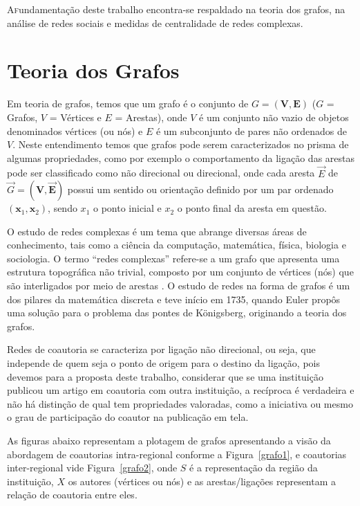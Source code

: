 

\lettrine{A} fundamentação deste trabalho encontra-se respaldado na teoria dos grafos, na análise de redes sociais e medidas de centralidade de redes complexas. 

\section{\textbf{Teoria dos Grafos}}\label{sec:grafos} 

Em teoria de grafos, temos que um grafo é o conjunto de $G = (\bm V,\bm E)$ ($G$ = Grafos, $V$ = Vértices e $E$ = Arestas), onde $V$ é um conjunto não vazio de objetos denominados vértices (ou nós) e $E$ é um subconjunto de pares não ordenados de $V$. Neste entendimento temos que grafos pode serem caracterizados no prisma de algumas propriedades, como por exemplo o comportamento da ligação das arestas pode ser classificado como não direcional ou direcional, onde cada aresta $\Vec E$ de $\Vec G = (\bm V,\bm \Vec E)$ possui um sentido ou orientação definido por um par ordenado $(\bm x_{1}, \bm x_{2})$, sendo $x_{1}$ o ponto inicial e $x_{2}$ o ponto final da aresta em questão.

O estudo de redes complexas é um tema  que abrange diversas áreas de conhecimento, tais como a ciência da computação, matemática, física, biologia e sociologia. 
O termo ``redes complexas'' refere-se a um grafo que apresenta uma estrutura topográfica não trivial, composto por um conjunto de vértices (nós) que são interligados por meio de arestas \citep{barabasi2003everything}. 
O estudo de redes na forma de grafos é um dos pilares da matemática discreta e teve início em 1735, quando Euler propôs uma solução para o problema das pontes de Königsberg, originando a teoria dos grafos.

Redes de coautoria se caracteriza por ligação não direcional, ou seja, que independe de quem seja o ponto de origem para o destino da ligação, pois devemos para a proposta deste trabalho, considerar que se uma instituição publicou um artigo em coautoria com outra instituição, a recíproca é verdadeira e não há distinção de qual tem propriedades valoradas, como a iniciativa ou mesmo o grau de participação do coautor na publicação em tela.

As figuras abaixo representam a plotagem de grafos apresentando a visão da abordagem de coautorias intra-regional conforme a Figura~\ref{grafo1}, e coautorias inter-regional vide Figura~\ref{grafo2}, onde $S$ é a representação da região da instituição, $X$ os autores (vértices ou nós) e as arestas/ligações representam a relação de coautoria entre eles.


